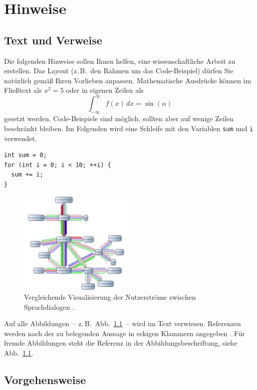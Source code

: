 \chapter{Hinweise}

\section{Text und Verweise}

Die folgenden Hinweise sollen Ihnen helfen, eine wissenschaftliche Arbeit zu erstellen.
Das Layout (z.\,B.\ den Rahmen um das Code-Beispiel) dürfen Sie natürlich gemäß Ihren
Vorlieben anpassen.
Mathematische Ausdrücke können im Fließtext als $x^2 = 5$ oder in eigenen Zeilen als
\[
  \int_{-\infty}^\infty f(x)\,dx = \sin(\alpha)
\]
gesetzt werden.
Code-Beispiele sind möglich, sollten aber auf wenige Zeilen beschränkt bleiben.
Im Folgenden wird eine Schleife mit den Variablen \lstinline+sum+ und \lstinline+i+
verwendet.

{\small
\begin{lstlisting}
int sum = 0;
for (int i = 0; i < 10; ++i) {
  sum += i;
}
\end{lstlisting}%
}

\begin{figure}[!htb]
  \centerline{\includegraphics[width=0.5\textwidth]{abbildung_1}}
  \caption{Vergleichende Visualisierung der Nutzerströme zwischen
    Sprachdialogen \cite{Zimmer2011}.}
  \label{abbildung1}
\end{figure}

Auf alle Abbildungen~-- z.\,B.\ Abb.~\ref{abbildung1}~-- wird im Text verwiesen.
Referenzen werden nach der zu belegenden Aussage in eckigen Klammern angegeben
\cite{Bostock2011,D3js,Laemmel2012}.
Für fremde Abbildungen steht die Referenz in der Abbildungsbeschriftung,
siehe Abb.~\ref{abbildung1}.

\section{Vorgehensweise}

